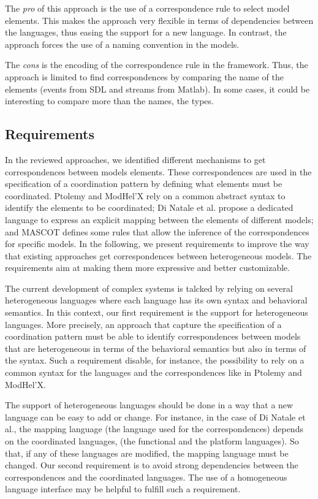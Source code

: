The \emph{pro} of this approach is the use of a correspondence rule to select model elements. This makes the approach very flexible in terms of dependencies between the languages, thus easing the support for a new language. In contrast, the approach forces the use of a naming convention in the models.     

The \emph{cons} is the encoding of the correspondence rule in the framework. Thus, the approach is limited to find correspondences by comparing the name of the elements (\ie events from SDL and streams from Matlab). In some cases, it could be interesting to compare more than the names, \eg the types. 


\subsection{Requirements}
In the reviewed approaches, we identified different mechanisms to get correspondences between models elements. These correspondences are used in the specification of a coordination pattern by defining what elements must be coordinated. Ptolemy and ModHel'X rely on a common abstract syntax to identify the elements to be coordinated; Di Natale et al. propose a dedicated language to express an explicit mapping between the elements of different models; and MASCOT defines some rules that allow the inference of the correspondences for specific models. In the following, we present requirements to improve the way that existing approaches get correspondences between heterogeneous models. The requirements aim at making them more expressive and better customizable.  

The current development of complex systems is talcked by relying on several heterogeneous languages where each language has its own syntax and behavioral semantics. In this context, our first requirement is the support for heterogeneous languages. More precisely, an approach that capture the specification of a coordination pattern must be able to identify correspondences between models that are heterogeneous in terms of the behavioral semantics but also in terms of the syntax. Such a requirement disable, for instance, the possibility to rely on a common syntax for the languages and the correspondences like in Ptolemy and ModHel'X. 


The support of heterogeneous languages should be done in a way that a new language can be easy to add or change. For instance, in the case of Di Natale et al., the mapping language (\ie the language used for the correspondences) depends on the coordinated languages, (\ie the functional and the platform languages). So that, if any of these languages are modified, the mapping language must be changed. Our second requirement is to avoid strong dependencies between the correspondences and the coordinated languages. The use of a homogeneous language interface may be helpful to fulfill such a requirement.  

